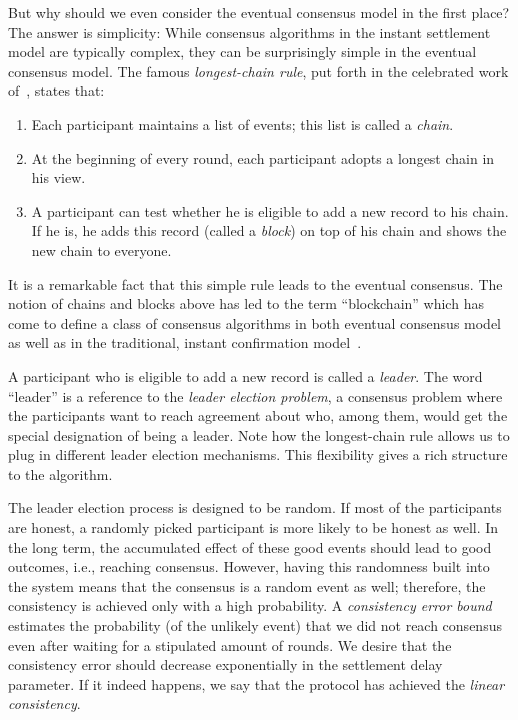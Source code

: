 But why should we even consider the eventual consensus model in the first place? 
The answer is simplicity: 
While consensus algorithms in the instant settlement model 
are typically complex, 
they can be surprisingly simple in the eventual consensus model. 
The famous \emph{longest-chain rule}, put forth in the 
celebrated work of~\citet{Nakamoto2008}, states that:
\begin{enumerate}
  \item Each participant maintains a list of events; 
  this list is called a \emph{chain}.

  \item At the beginning of every round, 
  each participant adopts a longest chain in his view.

  \item A participant can test whether he is eligible to add a new record to his chain. 
  If he is, he adds this record (called a \emph{block}) on top of his chain 
  and shows the new chain to everyone.
\end{enumerate}

It is a remarkable fact that this simple rule leads to the eventual consensus. 
The notion of chains and blocks above has led to the term ``blockchain'' 
which has come to define a class of consensus algorithms 
in both eventual consensus model as well as in the traditional, 
instant confirmation model~\cite{BlockchainAlgorithms}. 

A participant who is eligible to add a new record is called a \emph{leader}. 
The word ``leader'' is a reference to the \emph{leader election problem}, 
a consensus problem where the participants want to 
reach agreement about who, among them, would get 
the special designation of being a leader.
Note how the longest-chain rule allows us to plug in 
different leader election mechanisms. 
This flexibility gives a rich structure to the algorithm.

The leader election process is designed to be random. 
If most of the participants are honest, 
a randomly picked participant is more likely to be honest as well. 
In the long term, the accumulated effect of these good events 
should lead to good outcomes, i.e., reaching consensus. 
However, having this randomness built into the system means 
that the consensus is a random event as well; 
therefore, the consistency is achieved only with a high probability. 
A \emph{consistency error bound} 
estimates the probability 
(of the unlikely event) that we did not reach consensus 
even after waiting for a stipulated amount of rounds. 
We desire that the consistency error should decrease exponentially 
in the settlement delay parameter. 
If it indeed happens, 
we say that the protocol has achieved the \emph{linear consistency}.

